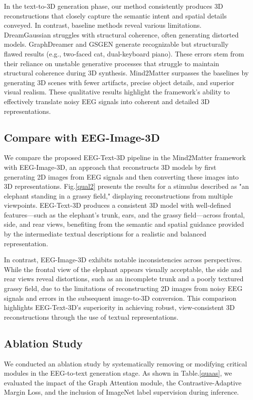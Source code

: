 \documentclass[sigconf]{acmart}
\begin{document}
In the text-to-3D generation phase, our method consistently produces 3D reconstructions that closely capture the semantic intent and spatial details conveyed. In contrast, baseline methods reveal various limitations. DreamGaussian struggles with structural coherence, often generating distorted models. GraphDreamer and GSGEN generate recognizable but structurally flawed results (e.g., two-faced cat, dual-keyboard piano). These errors stem from their reliance on unstable generative processes that struggle to maintain structural coherence during 3D synthesis. Mind2Matter surpasses the baselines by generating 3D scenes with fewer artifacts, precise object details, and superior visual realism. These qualitative results highlight the framework’s ability to effectively translate noisy EEG signals into coherent and detailed 3D representations.


\subsection{Compare with EEG-Image-3D}
We compare the proposed EEG-Text-3D pipeline in the Mind2Matter framework with EEG-Image-3D, an approach that reconstructs 3D models by first generating 2D images from EEG signals and then converting these images into 3D representations. Fig.\ref{qual2} presents the results for a stimulus described as "an elephant standing in a grassy field," displaying reconstructions from multiple viewpoints. EEG-Text-3D produces a consistent 3D model with well-defined features—such as the elephant’s trunk, ears, and the grassy field—across frontal, side, and rear views, benefiting from the semantic and spatial guidance provided by the intermediate textual descriptions for a realistic and balanced representation.

In contrast, EEG-Image-3D exhibits notable inconsistencies across perspectives. While the frontal view of the elephant appears visually acceptable, the side and rear views reveal distortions, such as an incomplete trunk and a poorly textured grassy field, due to the limitations of reconstructing 2D images from noisy EEG signals and errors in the subsequent image-to-3D conversion. This comparison highlights EEG-Text-3D’s superiority in achieving robust, view-consistent 3D reconstructions through the use of textual representations.


\subsection{Ablation Study}
We conducted an ablation study by systematically removing or modifying critical modules in the EEG-to-text generation stage. As shown in Table.\ref{quaas}, we evaluated the impact of the Graph Attention module, the Contrastive-Adaptive Margin Loss, and the inclusion of ImageNet label supervision during inference.
\end{document}
